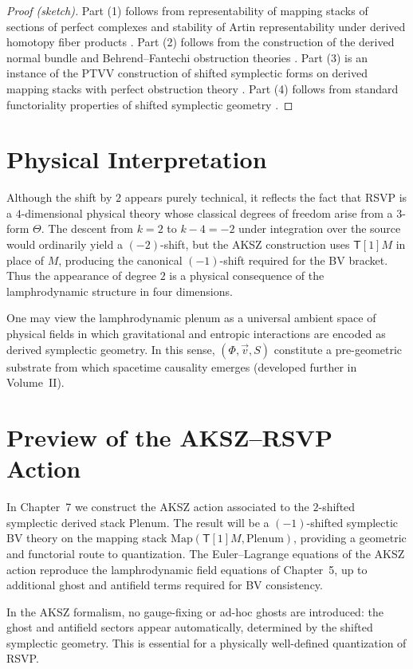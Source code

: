 \begin{proof}[Proof (sketch)]
Part (1) follows from representability of mapping stacks of sections of
perfect complexes and stability of Artin representability under derived
homotopy fiber products \cite{ToenVezzosi-HAGII}.
Part (2) follows from the construction of the derived normal bundle and
Behrend--Fantechi obstruction theories \cite{BF97}.
Part (3) is an instance of the PTVV construction of shifted symplectic
forms on derived mapping stacks with perfect obstruction theory
\cite{PTVV13}.
Part (4) follows from standard functoriality properties of shifted
symplectic geometry \cite{Calaque16}.
\end{proof}


\section{Physical Interpretation}

Although the shift by $2$ appears purely technical, it reflects the fact
that RSVP is a $4$-dimensional physical theory whose classical degrees
of freedom arise from a 3-form $\Theta$. The descent from $k=2$ to $k-4=-2$
under integration over the source would ordinarily yield a $(-2)$-shift,
but the AKSZ construction uses $\mathsf{T}[1]M$ in place of $M$,
producing the canonical $(-1)$-shift required for the BV bracket.
Thus the appearance of degree $2$ is a physical consequence of the
lamphrodynamic structure in four dimensions.

\begin{remark}
One may view the lamphrodynamic plenum as a universal ambient space of
physical fields in which gravitational and entropic interactions are
encoded as derived symplectic geometry. In this sense, $(\Phi,\vec v,S)$
constitute a pre-geometric substrate from which spacetime causality
emerges (developed further in Volume~II).
\end{remark}


\section{Preview of the AKSZ--RSVP Action}

In Chapter~7 we construct the AKSZ action associated to the
$2$-shifted symplectic derived stack $\mathrm{Plenum}$.
The result will be a $(-1)$-shifted symplectic BV theory on the
mapping stack $\mathrm{Map}(\mathsf{T}[1]M,\mathrm{Plenum})$,
providing a geometric and functorial route to quantization.
The Euler--Lagrange equations of the AKSZ action reproduce the
lamphrodynamic field equations of Chapter~5, up to additional ghost and
antifield terms required for BV consistency.

\begin{remark}
In the AKSZ formalism, no gauge-fixing or ad-hoc ghosts are introduced:
the ghost and antifield sectors appear automatically, determined by the
shifted symplectic geometry. This is essential for a physically
well-defined quantization of RSVP.
\end{remark}
